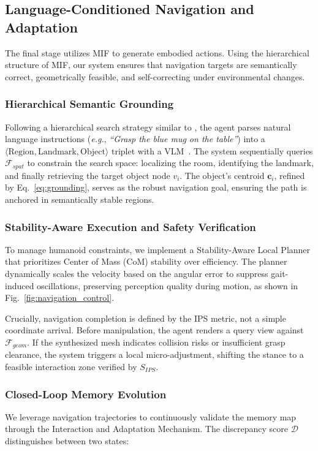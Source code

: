 \documentclass[conference]{IEEEtran}
\begin{document}
\subsection{Language-Conditioned Navigation and Adaptation}
\label{sec:navigation}

The final stage utilizes MIF to generate embodied actions. Using the hierarchical structure of MIF, our system ensures that navigation targets are semantically correct, geometrically feasible, and self-correcting under environmental changes.

\subsubsection{Hierarchical Semantic Grounding}
Following a hierarchical search strategy similar to \cite{Werby-RSS-24}, the agent parses natural language instructions (\emph{e.g.}, \textit{``Grasp the blue mug on the table''}) into a $\langle \text{Region}, \text{Landmark}, \text{Object} \rangle$ triplet with a VLM~\cite{hurst2024gpt}.
The system sequentially queries $\mathcal{F}_{spat}$ to constrain the search space: localizing the room, identifying the landmark, and finally retrieving the target object node $v_i$. The object's centroid $\mathbf{c}_i$, refined by Eq.~\ref{eq:grounding}, serves as the robust navigation goal, ensuring the path is anchored in semantically stable regions.

\subsubsection{Stability-Aware Execution and Safety Verification}
To manage humanoid constraints, we implement a Stability-Aware Local Planner that prioritizes Center of Mass (CoM) stability over efficiency. The planner dynamically scales the velocity based on the angular error to suppress gait-induced oscillations, preserving perception quality during motion, as shown in Fig.~\ref{fig:navigation_control}.



Crucially, navigation completion is defined by the IPS metric, not a simple coordinate arrival. Before manipulation, the agent renders a query view against $\mathcal{F}_{geom}$. If the synthesized mesh indicates collision risks or insufficient grasp clearance, the system triggers a local micro-adjustment, shifting the stance to a feasible interaction zone verified by $S_{IPS}$.

\subsubsection{Closed-Loop Memory Evolution}
We leverage navigation trajectories to continuously validate the memory map through the Interaction and Adaptation Mechanism. The discrepancy score $\mathcal{D}$ distinguishes between two states:
\end{document}
